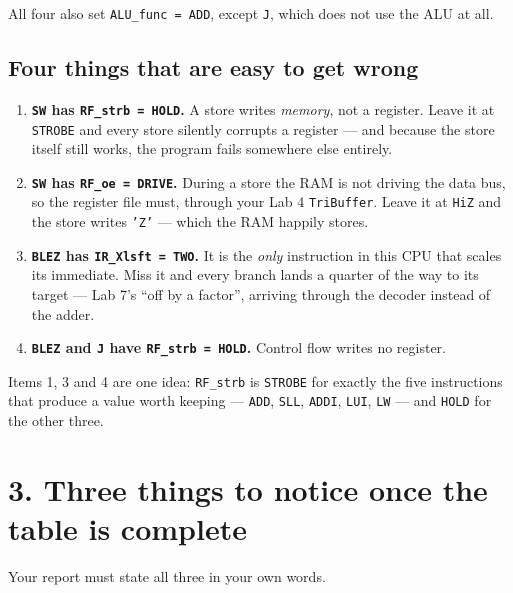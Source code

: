 \documentclass[11pt]{article}
\newcommand{\code}[1]{\texttt{#1}}
\begin{document}
All four also set \code{ALU\_func = ADD}, except \code{J}, which does not use
the ALU at all.

\subsection*{Four things that are easy to get wrong}

\begin{enumerate}[leftmargin=1.8em,itemsep=2pt]
\item \textbf{\code{SW} has \code{RF\_strb = HOLD}.} A store writes
\emph{memory}, not a register. Leave it at \code{STROBE} and every store
silently corrupts a register --- and because the store itself still works, the
program fails somewhere else entirely.

\item \textbf{\code{SW} has \code{RF\_oe = DRIVE}.} During a store the RAM is
not driving the data bus, so the register file must, through your Lab 4
\code{TriBuffer}. Leave it at \code{HiZ} and the store writes \code{'Z'} ---
which the RAM happily stores.

\item \textbf{\code{BLEZ} has \code{IR\_Xlsft = TWO}.} It is the \emph{only}
instruction in this CPU that scales its immediate. Miss it and every branch
lands a quarter of the way to its target --- Lab 7's ``off by a factor'',
arriving through the decoder instead of the adder.

\item \textbf{\code{BLEZ} and \code{J} have \code{RF\_strb = HOLD}.} Control
flow writes no register.
\end{enumerate}

Items 1, 3 and 4 are one idea: \code{RF\_strb} is \code{STROBE} for exactly the
five instructions that produce a value worth keeping --- \code{ADD},
\code{SLL}, \code{ADDI}, \code{LUI}, \code{LW} --- and \code{HOLD} for the other
three.

\section*{3. Three things to notice once the table is complete}

Your report must state all three in your own words.
\end{document}
